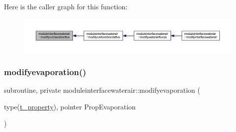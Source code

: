 Here is the caller graph for this function\+:\nopagebreak
\begin{figure}[H]
\begin{center}
\leavevmode
\includegraphics[width=350pt]{namespacemoduleinterfacewaterair_ad16fde1df2013d74710f42901a89754e_icgraph}
\end{center}
\end{figure}
\mbox{\label{namespacemoduleinterfacewaterair_a0c61f58f27a4d911118aadbccbbd1920}} 
\subsubsection{\texorpdfstring{modifyevaporation()}{modifyevaporation()}}
{\footnotesize\ttfamily subroutine, private moduleinterfacewaterair\+::modifyevaporation (\begin{DoxyParamCaption}\item[{type(\mbox{\hyperlink{structmoduleinterfacewaterair_1_1t__property}{t\+\_\+property}}), pointer}]{Prop\+Evaporation }\end{DoxyParamCaption})\hspace{0.3cm}{\ttfamily [private]}}

